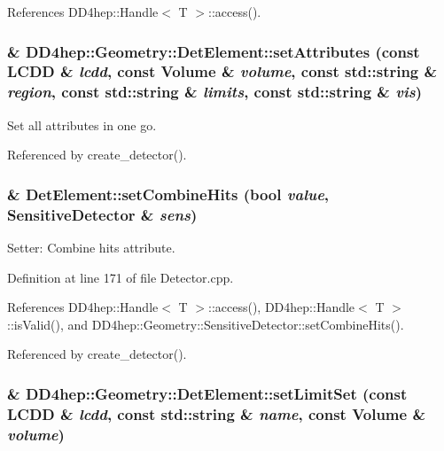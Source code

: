 References DD4hep::Handle$<$ T $>$::access().\hypertarget{class_d_d4hep_1_1_geometry_1_1_det_element_a08aef0534eb91ede146a6b17ac4f0fa8}{
\subsubsection[{setAttributes}]{\& DD4hep::Geometry::DetElement::setAttributes (const {\bf LCDD} \& {\em lcdd}, \/  const {\bf Volume} \& {\em volume}, \/  const std::string \& {\em region}, \/  const std::string \& {\em limits}, \/  const std::string \& {\em vis})}}
\label{class_d_d4hep_1_1_geometry_1_1_det_element_a08aef0534eb91ede146a6b17ac4f0fa8}


Set all attributes in one go. 

Referenced by create\_\-detector().\hypertarget{class_d_d4hep_1_1_geometry_1_1_det_element_a3b5dbbb87e8e1ddb64fc94e98cd5a70b}{
\subsubsection[{setCombineHits}]{ \& DetElement::setCombineHits (bool {\em value}, \/  {\bf SensitiveDetector} \& {\em sens})}}
\label{class_d_d4hep_1_1_geometry_1_1_det_element_a3b5dbbb87e8e1ddb64fc94e98cd5a70b}


Setter: Combine hits attribute. 

Definition at line 171 of file Detector.cpp.

References DD4hep::Handle$<$ T $>$::access(), DD4hep::Handle$<$ T $>$::isValid(), and DD4hep::Geometry::SensitiveDetector::setCombineHits().

Referenced by create\_\-detector().\hypertarget{class_d_d4hep_1_1_geometry_1_1_det_element_a3d49a91bfb52e81ce87f891ea5394c98}{
\subsubsection[{setLimitSet}]{\& DD4hep::Geometry::DetElement::setLimitSet (const {\bf LCDD} \& {\em lcdd}, \/  const std::string \& {\em name}, \/  const {\bf Volume} \& {\em volume})}}
\label{class_d_d4hep_1_1_geometry_1_1_det_element_a3d49a91bfb52e81ce87f891ea5394c98}


